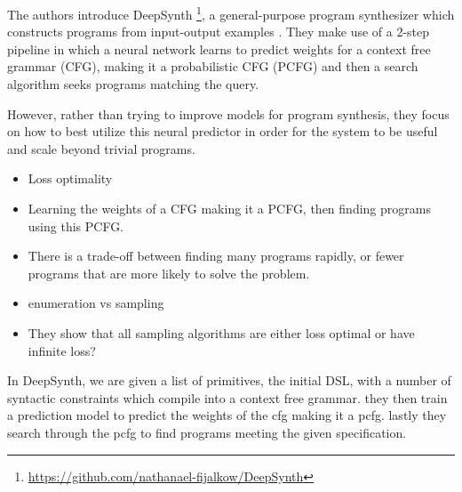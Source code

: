 The authors introduce DeepSynth \footnote{\url{https://github.com/nathanael-fijalkow/DeepSynth}}, a general-purpose program synthesizer which constructs programs from input-output examples \cite{fijalkow_scaling_2021}. They make use of a 2-step pipeline in which a neural network learns to predict weights for a context free grammar (CFG), making it a probabilistic CFG (PCFG) and then a search algorithm seeks programs matching the query.

However, rather than trying to improve models for program synthesis, they focus on how to best utilize this neural predictor in order for the system to be useful and scale beyond trivial programs.



\begin{itemize}
    \item Loss optimality
    \item Learning the weights of a CFG making it a PCFG, then finding programs using this PCFG. 
    \item There is a trade-off between finding many programs rapidly, or fewer programs that are more likely to solve the problem.
    \item enumeration vs sampling
    \item They show that all sampling algorithms are either loss optimal or have infinite loss?
\end{itemize}

In DeepSynth, we are given a list of primitives, the initial DSL, with a number of syntactic constraints which compile into a context free grammar. they then train a prediction model to predict the weights of the cfg making it a pcfg. lastly they search through the pcfg to find programs meeting the given specification.

